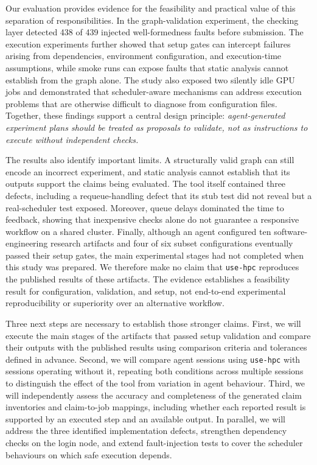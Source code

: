 \documentclass[pdflatex,sn-mathphys-num]{sn-jnl}
\theoremstyle{thmstyletwo}%
\theoremstyle{thmstylethree}%
\newcommand{\tool}{\texttt{use-hpc}}
\begin{document}
Our evaluation provides evidence for the feasibility and practical value of this separation of responsibilities. In the graph-validation experiment, the checking layer detected 438 of 439 injected well-formedness faults before submission. The execution experiments further showed that setup gates can intercept failures arising from dependencies, environment configuration, and execution-time assumptions, while smoke runs can expose faults that static analysis cannot establish from the graph alone. The study also exposed two silently idle GPU jobs and demonstrated that scheduler-aware mechanisms can address execution problems that are otherwise difficult to diagnose from configuration files. Together, these findings support a central design principle: \textit{agent-generated experiment plans should be treated as proposals to validate, not as instructions to execute without independent checks.}

The results also identify important limits. A structurally valid graph can still encode an incorrect experiment, and static analysis cannot establish that its outputs support the claims being evaluated. The tool itself contained three defects, including a requeue-handling defect that its stub test did not reveal but a real-scheduler test exposed. Moreover, queue delays dominated the time to feedback, showing that inexpensive checks alone do not guarantee a responsive workflow on a shared cluster. Finally, although an agent configured ten software-engineering research artifacts and four of six subset configurations eventually passed their setup gates, the main experimental stages had not completed when this study was prepared. We therefore make no claim that \tool{} reproduces the published results of these artifacts. The evidence establishes a feasibility result for configuration, validation, and setup, not end-to-end experimental reproducibility or superiority over an alternative workflow.

Three next steps are necessary to establish those stronger claims. First, we will execute the main stages of the artifacts that passed setup validation and compare their outputs with the published results using comparison criteria and tolerances defined in advance. Second, we will compare agent sessions using \tool{} with sessions operating without it, repeating both conditions across multiple sessions to distinguish the effect of the tool from variation in agent behaviour. Third, we will independently assess the accuracy and completeness of the generated claim inventories and claim-to-job mappings, including whether each reported result is supported by an executed step and an available output. In parallel, we will address the three identified implementation defects, strengthen dependency checks on the login node, and extend fault-injection tests to cover the scheduler behaviours on which safe execution depends.
\end{document}
